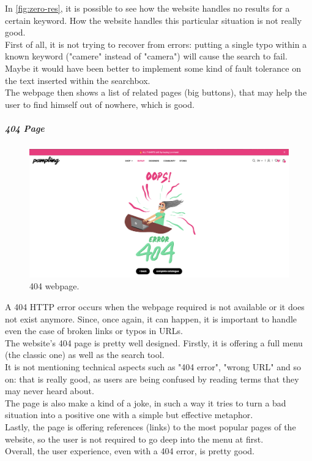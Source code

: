 In \cref{fig:zero-res}, it is possible to see how the website handles no results for a certain keyword. How the website handles this particular situation is not really good.\\
First of all, it is not trying to recover from errors: putting a single typo within a known keyword ("camere" instead of "camera") will cause the search to fail. Maybe it would have been better to implement some kind of fault tolerance on the text inserted within the searchbox.\\
The webpage then shows a list of related pages (big buttons), that may help the user to find himself out of nowhere, which is good.

\subparagraph{404 Page}
\begin{figure}[h!]
	\centering
	\includegraphics[scale=0.225]{images/404.png}
	\caption{404 webpage.}
	\label{fig:404}
\end{figure}

A 404 HTTP error occurs when the webpage required is not available or it does not exist anymore. Since, once again, it can happen, it is important to handle even the case of broken links or typos in URLs.\\
The website's 404 page is pretty well designed. Firstly, it is offering a full menu (the classic one) as well as the search tool.\\
It is not mentioning technical aspects such as "404 error", "wrong URL" and so on: that is really good, as users are being confused by reading terms that they may never heard about.\\
The page is also make a kind of a joke, in such a way it tries to turn a bad situation into a positive one with a simple but effective metaphor.\\
Lastly, the page is offering references (links) to the most popular pages of the website, so the user is not required to go deep into the menu at first.\\
Overall, the user experience, even with a 404 error, is pretty good.

